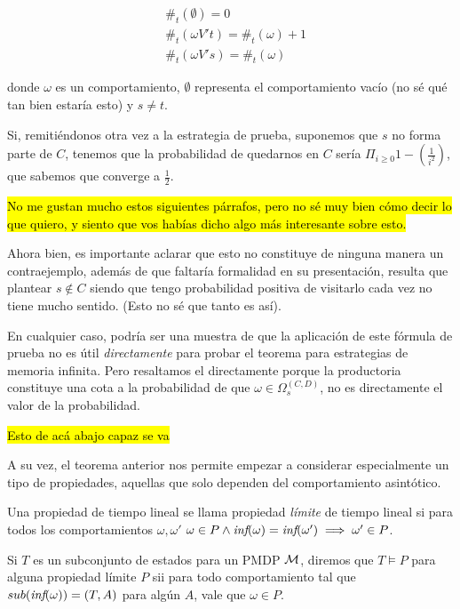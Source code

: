 \begin{align*}
	&\#_t(\emptyset) = 0 \\
	&\#_t(\omega V' t) = \#_t(\omega) + 1 \\
	&\#_t(\omega V' s) = \#_t(\omega)
\end{align*}

donde $\omega$ es un comportamiento, $\emptyset$ representa el comportamiento
vacío (no sé qué tan bien estaría esto) y $s \neq t$.

Si, remitiéndonos otra vez a la estrategia de prueba, suponemos que $s$ no
forma parte de $C$, tenemos que la probabilidad de quedarnos en $C$ sería
$\Pi_{i \geq 0} 1-(\frac{1}{i^2})$, que sabemos que converge a $\frac{1}{2}$.

\hl{No me gustan mucho estos siguientes párrafos, pero no sé muy bien cómo decir lo que quiero, y siento que vos habías dicho algo más interesante sobre esto.}

Ahora bien, es importante aclarar que esto no constituye de ninguna manera un
contraejemplo, además de que faltaría formalidad en su presentación, resulta
que plantear $s \notin C$ siendo que tengo probabilidad positiva de visitarlo
cada vez no tiene mucho sentido. (Esto no sé que tanto es así).

En cualquier caso, podría ser una muestra de que la aplicación de este fórmula
de prueba no es útil \textit{directamente} para probar el teorema para
estrategias de memoria infinita. Pero resaltamos el directamente porque la
productoria constituye una cota a la probabilidad de que $\omega \in
	\Omega_s^{(C,D)}$, no es directamente el valor de la probabilidad.

\hl{Esto de acá abajo capaz se va}

A su vez, el teorema anterior nos permite empezar a considerar especialmente un
tipo de propiedades, aquellas que solo dependen del comportamiento asintótico.

\begin{definition}
	Una propiedad de tiempo lineal se llama propiedad \textit{límite} de tiempo lineal si para todos los comportamientos $\omega, \omega'$ $\omega \in P \wedge \textit{inf}(\omega) = \textit{inf}(\omega') \implies \omega' \in P$.

	Si $T$ es un subconjunto de estados para un PMDP $\mathcal{M}$, diremos que $T \models
		P$ para alguna propiedad límite $P$ sii para todo comportamiento tal que
	$sub(\textit{inf}(\omega)) = (T,A)$ para algún $A$, vale que $\omega \in P$.
\end{definition}

